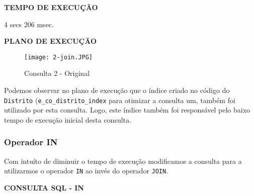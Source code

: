 \documentclass[12pt,a4paper]{article}
\begin{document}
\begin{flushleft}
\textbf{TEMPO DE EXECUÇÃO}\\
\end{flushleft}
4 secs 206 msec.\\

\begin{flushleft}
\textbf{PLANO DE EXECUÇÃO}\\
\end{flushleft}

\begin{figure}[H]
    \centering
    \texttt{[image: 2-join.JPG]}
    \caption{Consulta 2 - Original}
    \label{fig:diagrama}
\end{figure}

Podemos observar no plano de execução que o índice criado no código do \texttt{Distrito} (\texttt{e\_co\_distrito\_index} para otimizar a consulta um, também foi utilizado por esta consulta. Logo, este índice também foi responsável pelo baixo tempo de execução inicial desta consulta.

\subsubsection{Operador IN}

Com intuíto de diminuir o tempo de execução modificamos a consulta para a utilizarmos o operador \texttt{IN} ao invés do operador \texttt{JOIN}.

\vspace{0.5cm}

\begin{flushleft}
\textbf{CONSULTA SQL - IN}\\
\end{flushleft}
\end{document}
